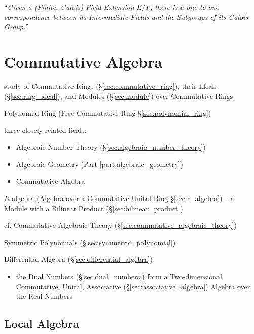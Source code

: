 ``\emph{Given a (Finite, Galois) Field Extension $E/F$, there is a one-to-one
correspondence between its Intermediate Fields and the Subgroups of its Galois
Group.}''



\section{Commutative Algebra}\label{sec:commutative_algebra}

study of Commutative Rings (\S\ref{sec:commutative_ring}), their Ideals
(\S\ref{sec:ring_ideal}), and Modules (\S\ref{sec:module}) over Commutative
Rings

Polynomial Ring (Free Commutative Ring \S\ref{sec:polynomial_ring})

three closely related fields:
\begin{itemize}
  \item Algebraic Number Theory (\S\ref{sec:algebraic_number_theory})
  \item Algebraic Geometry (Part \ref{part:algebraic_geometry})
  \item Commutative Algebra
\end{itemize}

\fist $R$-algebra (Algebra over a Commutative Unital Ring \S\ref{sec:r_algebra})
-- a Module with a Bilinear Product (\S\ref{sec:bilinear_product})

\fist cf. Commutative Algebraic Theory
(\S\ref{sec:commutative_algebraic_theory})

\fist Symmetric Polynomials (\S\ref{sec:symmetric_polynomial})

\fist Differential Algebra (\S\ref{sec:differential_algebra})

\begin{itemize}
  \item the Dual Numbers (\S\ref{sec:dual_numbers}) form a Two-dimensional
    Commutative, Unital, Associative (\S\ref{sec:associative_algebra}) Algebra
    over the Real Numbers
\end{itemize}



\subsection{Local Algebra}\label{sec:local_algebra}

